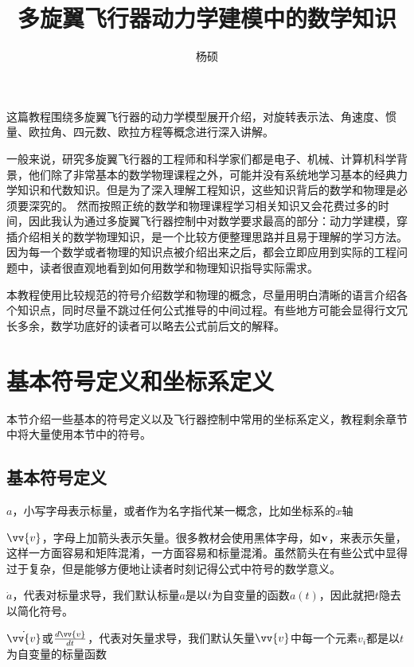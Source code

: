 \documentclass[11pt]{article}
\begin{document}
\title{多旋翼飞行器动力学建模中的数学知识}
\author{杨硕}

\maketitle
这篇教程围绕多旋翼飞行器的动力学模型展开介绍，对旋转表示法、角速度、惯量、欧拉角、四元数、欧拉方程等概念进行深入讲解。

一般来说，研究多旋翼飞行器的工程师和科学家们都是电子、机械、计算机科学背景，他们除了非常基本的数学物理课程之外，可能并没有系统地学习基本的经典力学知识和代数知识。但是为了深入理解工程知识，这些知识背后的数学和物理是必须要深究的。
然而按照正统的数学和物理课程学习相关知识又会花费过多的时间，因此我认为通过多旋翼飞行器控制中对数学要求最高的部分：动力学建模，穿插介绍相关的数学物理知识，是一个比较方便整理思路并且易于理解的学习方法。
因为每一个数学或者物理的知识点被介绍出来之后，都会立即应用到实际的工程问题中，读者很直观地看到如何用数学和物理知识指导实际需求。

本教程使用比较规范的符号介绍数学和物理的概念，尽量用明白清晰的语言介绍各个知识点，同时尽量不跳过任何公式推导的中间过程。有些地方可能会显得行文冗长多余，数学功底好的读者可以略去公式前后文的解释。

\section{基本符号定义和坐标系定义}
本节介绍一些基本的符号定义以及飞行器控制中常用的坐标系定义，教程剩余章节中将大量使用本节中的符号。
\subsection{基本符号定义}
$a$，小写字母表示标量，或者作为名字指代某一概念，比如坐标系的$x$轴

$\vv{v}$，字母上加箭头表示矢量。很多教材会使用黑体字母，如$\bf{v}$，来表示矢量，这样一方面容易和矩阵混淆，一方面容易和标量混淆。虽然箭头在有些公式中显得过于复杂，但是能够方便地让读者时刻记得公式中符号的数学意义。

$\dot{a}$，代表对标量求导，我们默认标量$a$是以$t$为自变量的函数$a(t)$，因此就把$t$隐去以简化符号。

$\dot{\vv{v}}$或$\frac{d\vv{v}}{dt}$，代表对矢量求导，我们默认矢量$\vv{v}$中每一个元素$v_i$都是以$t$为自变量的标量函数
\end{document}
